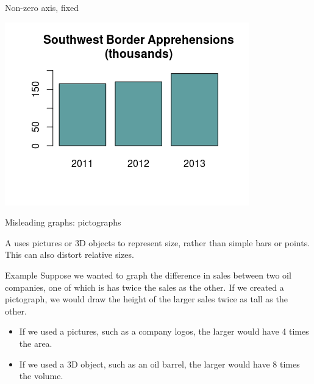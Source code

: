 \documentclass[]{beamer}
\begin{document}
\begin{frame}{Non-zero axis, fixed}
\begin{center}
\includegraphics{../images/ch02_bad_nonzero_fixed} 
\end{center}
\end{frame}

\begin{frame}{Misleading graphs: pictographs}
\begin{block}{}
A  uses pictures or 3D objects to represent size, rather than simple bars or points. This can also distort relative sizes.
\end{block}

\pause
\begin{exampleblock}{Example}
Suppose we wanted to graph the difference in sales between two oil companies, one of which is has twice the sales as the other. If we created a pictograph, we would draw the height of the larger sales twice as tall as the other.
\begin{itemize}
\item If we used a pictures, such as a company logos, the larger would have 4 times the area.
\item If we used a 3D object, such as an oil barrel, the larger would have 8 times the volume. 
\end{itemize}
\end{exampleblock}
\end{frame}
\end{document}
